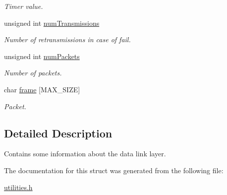 \begin{DoxyCompactItemize}
\begin{DoxyCompactList}\small\item\em Timer value. \end{DoxyCompactList}\item 
unsigned int \hyperlink{struct_link_layer_ab9a2bab82170cd79577445a56b92b74c}{num\+Transmissions}\hypertarget{struct_link_layer_ab9a2bab82170cd79577445a56b92b74c}{}\label{struct_link_layer_ab9a2bab82170cd79577445a56b92b74c}

\begin{DoxyCompactList}\small\item\em Number of retransmissions in case of fail. \end{DoxyCompactList}\item 
unsigned int \hyperlink{struct_link_layer_a1a7d90e68b90219ededf66d3535d5eb5}{num\+Packets}\hypertarget{struct_link_layer_a1a7d90e68b90219ededf66d3535d5eb5}{}\label{struct_link_layer_a1a7d90e68b90219ededf66d3535d5eb5}

\begin{DoxyCompactList}\small\item\em Number of packets. \end{DoxyCompactList}\item 
char \hyperlink{struct_link_layer_a9cdc884a9d83cc643bd8d9ff6d50c6e9}{frame} \mbox{[}M\+A\+X\+\_\+\+S\+I\+ZE\mbox{]}\hypertarget{struct_link_layer_a9cdc884a9d83cc643bd8d9ff6d50c6e9}{}\label{struct_link_layer_a9cdc884a9d83cc643bd8d9ff6d50c6e9}

\begin{DoxyCompactList}\small\item\em Packet. \end{DoxyCompactList}\end{DoxyCompactItemize}


\subsection{Detailed Description}
Contains some information about the data link layer. 

The documentation for this struct was generated from the following file\+:\begin{DoxyCompactItemize}
\item 
\hyperlink{utilities_8h}{utilities.\+h}\end{DoxyCompactItemize}
